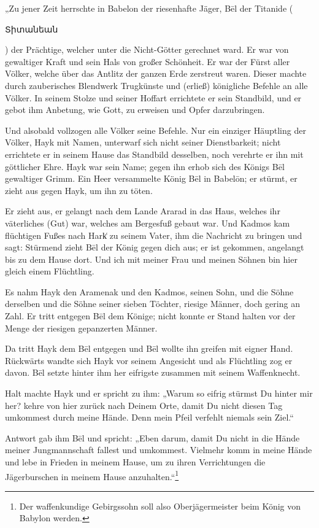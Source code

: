 \documentclass{article}
\begin{document}
„Zu jener Zeit herrschte in Babelon der riesenhafte Jäger, Bēl der Titanide (\begin{armenian}Տիտանեան\end{armenian}) der Prächtige, welcher unter die Nicht-Götter gerechnet ward. Er war von gewaltiger Kraft und sein Hals von großer Schönheit. Er war der Fürst aller Völker, welche über das Antlitz der ganzen Erde zerstreut waren. Dieser machte durch zauberisches Blendwerk Trugkünste und (erließ) königliche Befehle an alle Völker. In seinem Stolze und seiner Hoffart errichtete er sein Standbild, und er gebot ihm Anbetung, wie Gott, zu erweisen und Opfer darzubringen.

Und alsobald vollzogen alle Völker seine Befehle. Nur ein einziger Häuptling der Völker, Hayk mit Namen, unterwarf sich nicht seiner Dienstbarkeit; nicht errichtete er in seinem Hause das Standbild desselben, noch verehrte er ihn mit göttlicher Ehre. Hayk war sein Name; gegen ihn erhob sich des Königs Bēl gewaltiger Grimm. Ein Heer versammelte König Bēl in Babelōn; er stürmt, er zieht aus gegen Hayk, um ihn zu töten.

Er zieht aus, er gelangt nach dem Lande Ararad in das Haus, welches ihr väterliches (Gut) war, welches am Bergesfuß gebaut war. Und Kadmos kam flüchtigen Fußes nach Hark͑ zu seinem Vater, ihm die Nachricht zu bringen und sagt: Stürmend zieht Bēl der König gegen dich aus; er ist gekommen, angelangt bis zu dem Hause dort. Und ich mit meiner Frau und meinen Söhnen bin hier gleich einem Flüchtling.

Es nahm Hayk den Aramenak und den Kadmos, seinen Sohn, und die Söhne derselben und die Söhne seiner sieben Töchter, riesige Männer, doch gering an Zahl. Er tritt entgegen Bēl dem Könige; nicht konnte er Stand halten vor der Menge der riesigen gepanzerten Männer.

Da tritt Hayk dem Bēl entgegen und Bēl wollte ihn greifen mit eigner Hand. Rückwärts wandte sich Hayk vor seinem Angesicht und als Flüchtling zog er davon. Bēl setzte hinter ihm her eifrigste zusammen mit seinem Waffenknecht.

Halt machte Hayk und er spricht zu ihm: „Warum so eifrig stürmst Du hinter mir her? kehre von hier zurück nach Deinem Orte, damit Du nicht diesen Tag umkommest durch meine Hände. Denn mein Pfeil verfehlt niemals sein Ziel.“

Antwort gab ihm Bēl und spricht: „Eben darum, damit Du nicht in die Hände meiner Jungmannschaft fallest und umkommest. Vielmehr komm in meine Hände und lebe in Frieden in meinem Hause, um zu ihren Verrichtungen die Jägerburschen in meinem Hause anzuhalten.“\footnote{Der waffenkundige Gebirgssohn soll also Oberjägermeister beim König von Babylon werden.}
\end{document}
